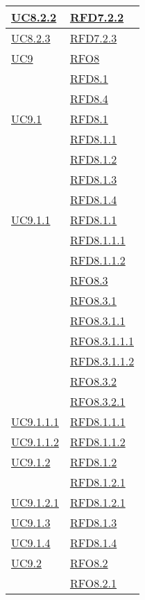 \begin{longtable}{|>{\centering}m{5cm}|m{5cm}<{\centering}|}
\hyperref[UC8.2.2]{UC8.2.2} & \hyperlink{RFD7.2.2}{RFD7.2.2}\\ \hline
\hyperref[UC8.2.3]{UC8.2.3} & \hyperlink{RFD7.2.3}{RFD7.2.3}\\ \hline
\hyperref[UC9]{UC9} & \hyperlink{RFO8}{RFO8}\\
& \hyperlink{RFD8.1}{RFD8.1}\\
& \hyperlink{RFD8.4}{RFD8.4}\\ \hline
\hyperref[UC9.1]{UC9.1} & \hyperlink{RFD8.1}{RFD8.1}\\
& \hyperlink{RFD8.1.1}{RFD8.1.1}\\
& \hyperlink{RFD8.1.2}{RFD8.1.2}\\
& \hyperlink{RFD8.1.3}{RFD8.1.3}\\
& \hyperlink{RFD8.1.4}{RFD8.1.4}\\ \hline
\hyperref[UC9.1.1]{UC9.1.1} & \hyperlink{RFD8.1.1}{RFD8.1.1}\\
& \hyperlink{RFD8.1.1.1}{RFD8.1.1.1}\\
& \hyperlink{RFD8.1.1.2}{RFD8.1.1.2}\\
& \hyperlink{RFO8.3}{RFO8.3}\\
& \hyperlink{RFO8.3.1}{RFO8.3.1}\\
& \hyperlink{RFO8.3.1.1}{RFO8.3.1.1}\\
& \hyperlink{RFO8.3.1.1.1}{RFO8.3.1.1.1}\\
& \hyperlink{RFD8.3.1.1.2}{RFD8.3.1.1.2}\\
& \hyperlink{RFO8.3.2}{RFO8.3.2}\\
& \hyperlink{RFO8.3.2.1}{RFO8.3.2.1}\\ \hline
\hyperref[UC9.1.1.1]{UC9.1.1.1} & \hyperlink{RFD8.1.1.1}{RFD8.1.1.1}\\ \hline
\hyperref[UC9.1.1.2]{UC9.1.1.2} & \hyperlink{RFD8.1.1.2}{RFD8.1.1.2}\\ \hline
\hyperref[UC9.1.2]{UC9.1.2} & \hyperlink{RFD8.1.2}{RFD8.1.2}\\
& \hyperlink{RFD8.1.2.1}{RFD8.1.2.1}\\ \hline
\hyperref[UC9.1.2.1]{UC9.1.2.1} & \hyperlink{RFD8.1.2.1}{RFD8.1.2.1}\\ \hline
\hyperref[UC9.1.3]{UC9.1.3} & \hyperlink{RFD8.1.3}{RFD8.1.3}\\ \hline
\hyperref[UC9.1.4]{UC9.1.4} & \hyperlink{RFD8.1.4}{RFD8.1.4}\\ \hline
\hyperref[UC9.2]{UC9.2} & \hyperlink{RFO8.2}{RFO8.2}\\
& \hyperlink{RFO8.2.1}{RFO8.2.1}\\

\end{longtable}

